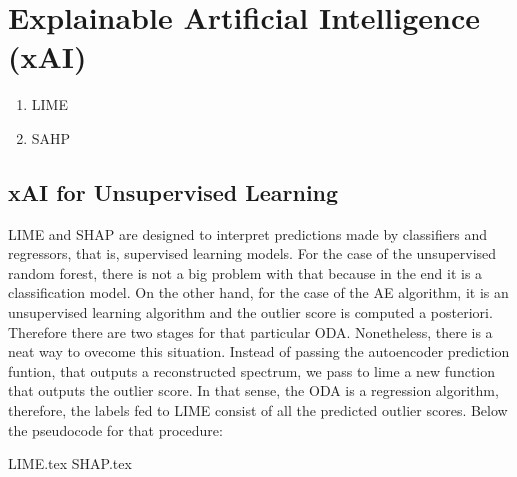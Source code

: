 \section{E\textbf{x}plainable \textbf{A}rtificial \textbf{I}ntelligence (xAI)}

\begin{enumerate}
  
  \item LIME
  
  \item SAHP
\end{enumerate}

\subsection{xAI for Unsupervised Learning}

LIME and SHAP are designed to interpret predictions made by classifiers and regressors, that is, supervised learning
models. For the case of the unsupervised random forest, there is not a big problem with that because in the end it is a classification model. On the other hand, for the case of the AE algorithm, it is an unsupervised learning algorithm and the outlier score is computed a posteriori. Therefore there are two stages for that particular ODA. Nonetheless, there is a neat way to ovecome this situation. Instead of passing the autoencoder prediction funtion, that outputs a reconstructed spectrum, we pass to lime a new function that outputs the outlier score. In that sense, the ODA is a regression algorithm, therefore, the labels fed to LIME consist of all the predicted outlier scores. Below the pseudocode for that procedure:

%
{LIME.tex}
{SHAP.tex}
